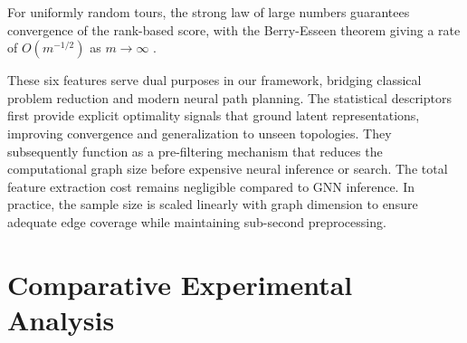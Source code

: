 \documentclass[10pt,twoside]{article}
\numberwithin{equation}{section}
\begin{document}


	For uniformly random tours, the strong law of large numbers guarantees convergence of the rank-based score, with the Berry-Esseen theorem giving a rate of $O(m^{-1/2})$ as $m\rightarrow \infty$ \cite{Berry1941, Korolev2010}. %


	


	These six features serve dual purposes in our framework, bridging classical problem reduction and modern neural path planning. The statistical descriptors first provide explicit optimality signals that ground latent representations, improving convergence and generalization to unseen topologies. They subsequently function as a pre-filtering mechanism that reduces the computational graph size before expensive neural inference or search. The total feature extraction cost remains negligible compared to GNN inference. In practice, the sample size is scaled linearly with graph dimension to ensure adequate edge coverage while maintaining sub-second preprocessing. %


		




	\section{Comparative Experimental Analysis}
\end{document}
